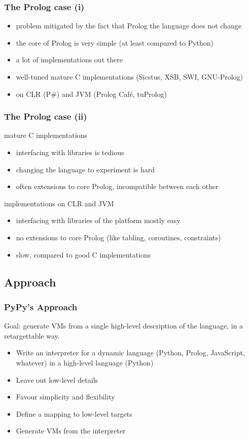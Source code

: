 \documentclass[utf8]{beamer}
\begin{document}
\begin{frame}
  \frametitle{The Prolog case (i)}
  \begin{itemize}
  \item
    problem mitigated by the fact that Prolog the language does not change
  \item
    the core of Prolog is very simple (at least compared to Python)
  \item
    a lot of implementations out there
  \item
    well-tuned mature C implementations (Sicstus, XSB, SWI, GNU-Prolog)
  \item
    on CLR (P\#) and JVM (Prolog Café, tuProlog)
  \end{itemize}
\end{frame}

\begin{frame}
  \frametitle{The Prolog case (ii)}
  \begin{block}{mature C implementations}
    \begin{itemize}
    \item
      interfacing with libraries is tedious
    \item
      changing the language to experiment is hard
    \item
      often extensions to core Prolog, incompatible between each other
    \end{itemize}
  \end{block}
  \pause
  \begin{block}{implementations on CLR and JVM}
    \begin{itemize}
    \item
      interfacing with libraries of the platform mostly easy
    \item
      no extensions to core Prolog (like tabling, coroutines, constraints)
    \item
      slow, compared to good C implementations
    \end{itemize}
  \end{block}
\end{frame}



\subsection{Approach}
\begin{frame}
  \frametitle{PyPy's Approach}
    \alert{Goal:} generate VMs from a single high-level description of the
     language, in a retargettable way.
  \begin{itemize}
  \item
    Write an  interpreter for a dynamic language (Python, Prolog, JavaScript,
    whatever) in a high-level language (Python)
  \item
    Leave out low-level details
  \item
    Favour simplicity and flexibility
  \item
    Define a mapping to low-level targets
  \item
    Generate VMs from the interpreter
  \end{itemize}
\end{frame}
\end{document}
